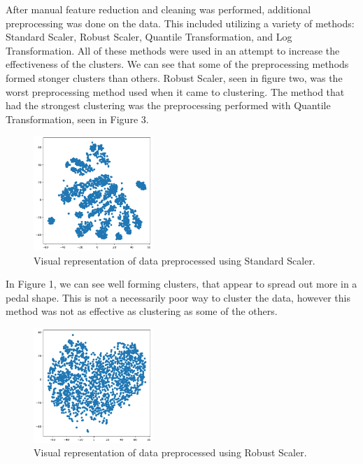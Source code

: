 \documentclass[twocolumn]{article}
\begin{document}
After manual feature reduction and cleaning was performed, additional preprocessing was done on the data. This included utilizing
a variety of methods: Standard Scaler, Robust Scaler, Quantile Transformation, and Log Transformation. All of these methods were used 
in an attempt to increase the effectiveness of the clusters. We can see that some of the preprocessing methods formed stonger clusters than others. Robust Scaler, seen in figure two, was the worst preprocessing method used when it came to clustering. The method that had the strongest clustering was the preprocessing performed with Quantile Transformation, seen in Figure 3.

\begin{figure}
    \centering
    \includegraphics[width=0.4\textwidth]{images/standard_scaler.png}
    \caption{Visual representation of data preprocessed using Standard Scaler.}
\end{figure}

In Figure 1, we can see well forming clusters, that appear to spread out more in a pedal shape. This is not a necessarily poor way to cluster the data, however this method was not as effective as clustering as some of the others.

\begin{figure}
    \centering
    \includegraphics[width=0.4\textwidth]{images/robust_scaler.png}
    \caption{Visual representation of data preprocessed using Robust Scaler.}
\end{figure}
\end{document}
